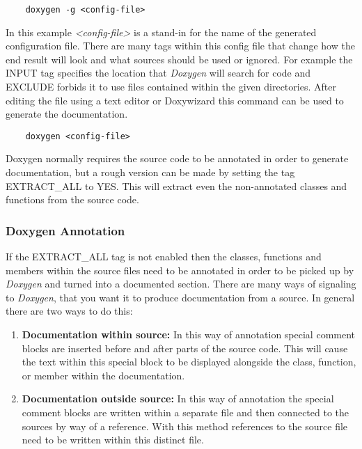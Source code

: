 \begin{verbatim}
    doxygen -g <config-file>
\end{verbatim}

In this example \textit{<config-file>} is a stand-in for the name of the generated configuration file. There are many tags within this config file that change how 
the end result will look and what sources should be used or ignored. For example the INPUT tag specifies the location that \textit{Doxygen} will search for code and
EXCLUDE forbids it to use files contained within the given directories. After editing the file using a text editor or Doxywizard this command can be used to generate 
the documentation.

\begin{verbatim}
    doxygen <config-file>
\end{verbatim}

Doxygen normally requires the source code to be annotated in order to generate documentation, but a rough version can be made by setting the tag EXTRACT\_ALL to YES.
This will extract even the non-annotated classes and functions from the source code.

\subsubsection{Doxygen Annotation}

If the EXTRACT\_ALL tag is not enabled then the classes, functions and members within the source files need to be annotated in order to be picked up by \textit{Doxygen}
and turned into a documented section. There are many ways of signaling to \textit{Doxygen}, that you want it to produce documentation from a source. In general there
are two ways to do this:
\begin{enumerate}
    \item \textbf{Documentation within source:} In this way of annotation special comment blocks are inserted before and after parts of the source code. 
                This will cause the text within this special block to be displayed alongside the class, function, or member within the documentation.
    \item \textbf{Documentation outside source:} In this way of annotation the special comment blocks are written within a separate file and then connected 
                to the sources by way of a reference. With this method references to the source file need to be written within this distinct file.
\end{enumerate}

